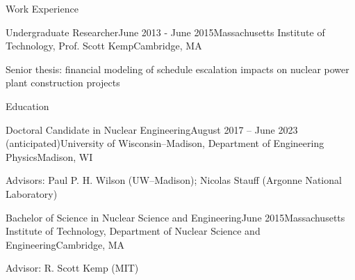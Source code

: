 \documentclass{resume} %
\begin{document}
\begin{rSection}{Work Experience}

\begin{rSubsection}{Undergraduate Researcher}{June 2013 - June 2015}{Massachusetts Institute of Technology, Prof. Scott Kemp}{Cambridge, MA}
  \setlength{\itemsep}{-3pt}
  \item Senior thesis: financial modeling of schedule escalation impacts on nuclear power plant construction projects
\end{rSubsection}

\end{rSection}



\begin{rSection}{Education}

\begin{rSubsection}{Doctoral Candidate in Nuclear Engineering}{August 2017 -- June 2023 (anticipated)}{University of Wisconsin--Madison, Department of Engineering Physics}{Madison, WI}
  \item Advisors: Paul P. H. Wilson (UW--Madison); Nicolas Stauff (Argonne National Laboratory)
\end{rSubsection}

\begin{rSubsection}{Bachelor of Science in Nuclear Science and Engineering}{June 2015}{Massachusetts Institute of Technology, Department of Nuclear Science and Engineering}{Cambridge, MA}
  \item Advisor: R. Scott Kemp (MIT)
\end{rSubsection}

\end{rSection}







\end{document}
